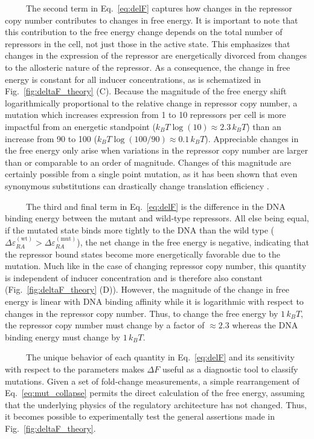 \documentclass[12pt]{caltech_thesis}
\begin{document}
~~~~~The second term in Eq.~\ref{eq:delF} captures how changes in the
repressor copy number contributes to changes in free energy. It is
important to note that this contribution to the free energy change
depends on the total number of repressors in the cell, not just those in
the active state. This emphasizes that changes in the expression of the
repressor are energetically divorced from changes to the allosteric
nature of the repressor. As a consequence, the change in free energy is
constant for all inducer concentrations, as is schematized in
Fig.~\ref{fig:deltaF_theory} (C). Because the magnitude of the free
energy shift logarithmically proportional to the relative change in
repressor copy number, a mutation which increases expression from 1 to
10 repressors per cell is more impactful from an energetic standpoint
(\(k_BT \log(10) \approx 2.3\, k_BT\)) than an increase from 90 to 100
(\(k_BT \log(100/90) \approx 0.1\, k_BT\)). Appreciable changes in the
free energy only arise when variations in the repressor copy number are
larger than or comparable to an order of magnitude. Changes of this
magnitude are certainly possible from a single point mutation, as it has
been shown that even synonymous substitutions can drastically change
translation efficiency \autocite{frumkin2018}.

~~~~~The third and final term in Eq.~\ref{eq:delF} is the difference in
the DNA binding energy between the mutant and wild-type repressors. All
else being equal, if the mutated state binds more tightly to the DNA
than the wild type
(\(\Delta\varepsilon_{RA}^\mathrm{(wt)}> \Delta\varepsilon_{RA}^\mathrm{(mut)}\)),
the net change in the free energy is negative, indicating that the
repressor bound states become more energetically favorable due to the
mutation. Much like in the case of changing repressor copy number, this
quantity is independent of inducer concentration and is therefore also
constant (Fig.~\ref{fig:deltaF_theory} (D)). However, the magnitude of
the change in free energy is linear with DNA binding affinity while it
is logarithmic with respect to changes in the repressor copy number.
Thus, to change the free energy by \(1\, k_BT\), the repressor copy
number must change by a factor of \(\approx 2.3\) whereas the DNA
binding energy must change by \(1\, k_BT\).

~~~~~The unique behavior of each quantity in Eq.~\ref{eq:delF} and its
sensitivity with respect to the parameters makes \(\Delta F\) useful as
a diagnostic tool to classify mutations. Given a set of fold-change
measurements, a simple rearrangement of Eq.~\ref{eq:mut_collapse}
permits the direct calculation of the free energy, assuming that the
underlying physics of the regulatory architecture has not changed. Thus,
it becomes possible to experimentally test the general assertions made
in Fig.~\ref{fig:deltaF_theory}.
\end{document}
